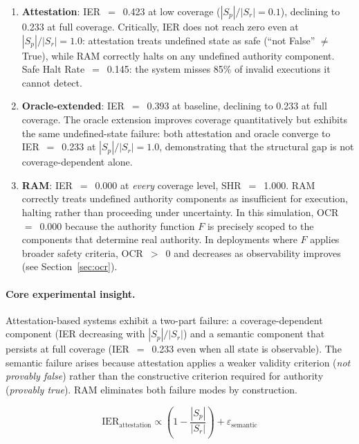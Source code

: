 \documentclass[11pt]{article}
\newcommand{\Sr}{S_r}
\newcommand{\Sp}{S_p}
\newcommand{\IER}{\mathrm{IER}}
\begin{document}
\begin{enumerate}[leftmargin=*, label=(\roman*)]
  \item \textbf{Attestation}: IER~$=$~0.423 at low coverage ($|\Sp|/|\Sr|=0.1$),
        declining to 0.233 at full coverage.
        Critically, IER does not reach zero even at $|\Sp|/|\Sr|=1.0$: attestation
        treats undefined state as safe (``not False'' $\neq$ True), while RAM
        correctly halts on any undefined authority component.
        Safe Halt Rate~$=$~0.145: the system misses 85\% of invalid executions
        it cannot detect.

  \item \textbf{Oracle-extended}: IER~$=$~0.393 at baseline, declining to 0.233 at
        full coverage.
        The oracle extension improves coverage quantitatively but exhibits the same
        undefined-state failure: both attestation and oracle converge to
        IER~$=$~0.233 at $|\Sp|/|\Sr|=1.0$, demonstrating that the structural
        gap is not coverage-dependent alone.

  \item \textbf{RAM}: IER~$=$~0.000 at \emph{every} coverage level, SHR~$=$~1.000.
        RAM correctly treats undefined authority components as insufficient for
        execution, halting rather than proceeding under uncertainty.
        In this simulation, OCR~$=$~0.000 because the authority function $F$ is
        precisely scoped to the components that determine real authority.
        In deployments where $F$ applies broader safety criteria, OCR~$>$~0 and
        decreases as observability improves (see Section~\ref{sec:ocr}).
\end{enumerate}

\paragraph{Core experimental insight.}

Attestation-based systems exhibit a two-part failure: a coverage-dependent
component (IER decreasing with $|\Sp|/|\Sr|$) and a semantic component that
persists at full coverage (IER~$=$~0.233 even when all state is observable).
The semantic failure arises because attestation applies a weaker validity
criterion (\emph{not provably false}) rather than the constructive criterion
required for authority (\emph{provably true}).
RAM eliminates both failure modes by construction.

\[
\IER_{\text{attestation}} \propto \left(1 - \frac{|\Sp|}{|\Sr|}\right) + \varepsilon_{\text{semantic}}
\]
\end{document}
